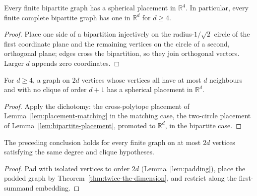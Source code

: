 \begin{lemma}
  \label{lem:bipartite-placement}
  \leanok
  Every finite bipartite graph has a spherical placement in $\mathbb{R}^4$. In particular,
  every finite complete bipartite graph has one in $\mathbb{R}^d$ for $d \ge 4$.
\end{lemma}
\begin{proof}
  Place one side of a bipartition injectively on the radius-$1/\sqrt2$ circle of the first
  coordinate plane and the remaining vertices on the circle of a second, orthogonal plane;
  edges cross the bipartition, so they join orthogonal vectors. Larger $d$ appends zero
  coordinates.
\end{proof}

\begin{theorem}
  \label{thm:twice-the-dimension}
  \leanok
  For $d \ge 4$, a graph on $2d$ vertices whose vertices all have at most $d$ neighbours
  and with no clique of order $d + 1$ has a spherical placement in $\mathbb{R}^d$.
\end{theorem}
\begin{proof}
  Apply the dichotomy: the cross-polytope placement of
  Lemma~\ref{lem:placement-matching} in the matching case, the two-circle placement of
  Lemma~\ref{lem:bipartite-placement}, promoted to $\mathbb{R}^d$, in the bipartite case.
\end{proof}

\begin{theorem}
  \label{thm:at-most-twice-the-dimension}
  \leanok
  The preceding conclusion holds for every finite graph on at most $2d$ vertices
  satisfying the same degree and clique hypotheses.
\end{theorem}
\begin{proof}
  Pad with isolated vertices to order $2d$ (Lemma~\ref{lem:padding}), place the padded
  graph by Theorem~\ref{thm:twice-the-dimension}, and restrict along the first-summand
  embedding.
\end{proof}

